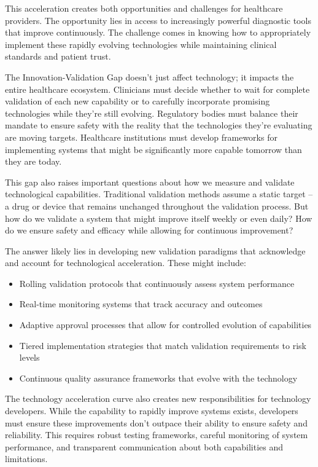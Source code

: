 \documentclass[
  Letterpaper,
]{scrbook}
\providecommand{\tightlist}{%
  \setlength{\itemsep}{0pt}\setlength{\parskip}{0pt}}\usepackage{longtable,booktabs,array}
\begin{document}
This acceleration creates both opportunities and challenges for
healthcare providers. The opportunity lies in access to increasingly
powerful diagnostic tools that improve continuously. The challenge comes
in knowing how to appropriately implement these rapidly evolving
technologies while maintaining clinical standards and patient trust.

The Innovation-Validation Gap doesn't just affect technology; it impacts
the entire healthcare ecosystem. Clinicians must decide whether to wait
for complete validation of each new capability or to carefully
incorporate promising technologies while they're still evolving.
Regulatory bodies must balance their mandate to ensure safety with the
reality that the technologies they're evaluating are moving targets.
Healthcare institutions must develop frameworks for implementing systems
that might be significantly more capable tomorrow than they are today.

This gap also raises important questions about how we measure and
validate technological capabilities. Traditional validation methods
assume a static target -- a drug or device that remains unchanged
throughout the validation process. But how do we validate a system that
might improve itself weekly or even daily? How do we ensure safety and
efficacy while allowing for continuous improvement?

The answer likely lies in developing new validation paradigms that
acknowledge and account for technological acceleration. These might
include:

\begin{itemize}
\tightlist
\item
  Rolling validation protocols that continuously assess system
  performance
\item
  Real-time monitoring systems that track accuracy and outcomes
\item
  Adaptive approval processes that allow for controlled evolution of
  capabilities
\item
  Tiered implementation strategies that match validation requirements to
  risk levels
\item
  Continuous quality assurance frameworks that evolve with the
  technology
\end{itemize}

The technology acceleration curve also creates new responsibilities for
technology developers. While the capability to rapidly improve systems
exists, developers must ensure these improvements don't outpace their
ability to ensure safety and reliability. This requires robust testing
frameworks, careful monitoring of system performance, and transparent
communication about both capabilities and limitations.
\end{document}
